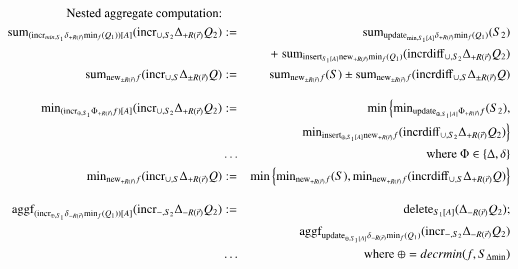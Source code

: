 \documentclass{article}
\begin{document}
%
\begin{figure*}
\begin{eqnarray}
\mbox{Nested aggregate computation:} && \nonumber
\\
\label{eq:na1}
\algsum_{(\algincr_{min, S_1} \delta_{+R(\vec{r})} \algmin_{f}(Q_1))[A]}
(\algincr_{\cup,S_2} \Delta_{+R(\vec{r})} Q_2)
&:=&
\algsum_{\algupdate_{\min, S_{1}[A]} \delta_{+R(\vec{r})} \algmin_{f}(Q_1)}(S_2)
\\
\nonumber &&
+ \; \algsum_{\alginsert_{S_{1}[A]} \algnew_{+R(\vec{r})} \algmin_{f}(Q_1)}
    (\algincrdiff_{\cup, S_2} \Delta_{+R(\vec{r})} Q_2)
\\
\label{eq:na2}
\algsum_{\algnew_{\pm R(\vec{r})} f} (\algincr_{\cup,S} \Delta_{\pm R(\vec{r})} Q)
&:=&
\algsum_{\algnew_{\pm R(\vec{r})} f}(S) 
    \pm \algsum_{\algnew_{\pm R(\vec{r})} f}
        (\algincrdiff_{\cup, S} \Delta_{\pm R(\vec{r})} Q)
%
%
\\[2ex]
\label{eq:na3}
\algmin_{(\algincr_{\oplus, S_1} \Phi_{+ R(\vec{r})} f)[A]}
(\algincr_{\cup, S_2} \Delta_{+R(\vec{r})} Q_2)
&:=&
\min \Big\{
\algmin_{\algupdate_{\oplus, S_1[A]} \Phi_{+R(\vec{r})} f} (S_2),
\\
\nonumber &&
\qquad \; \algmin_{\alginsert_{\oplus, S_1[A]} \algnew_{+R(\vec{r})} f}
(\algincrdiff_{\cup, S_2} \Delta_{+R(\vec{r})} Q_2)
\Big\}
\\
\nonumber &\dots& \mbox{where $\Phi \in \{\Delta, \delta\}$}
\\
%
%
\label{eq:na4}
\algmin_{\algnew_{+R(\vec{r})} f} (\algincr_{\cup, S} \Delta_{+R(\vec{r})} Q)
&:=&
\min \Big\{
\algmin_{\algnew_{+R(\vec{r})} f} (S), 
\algmin_{\algnew_{+R(\vec{r})} f} (\algincrdiff_{\cup, S} \Delta_{+R(\vec{r})} Q)
\Big\}
%
%
%
\\[2ex]
\label{eq:na5}
\algaggf_{(\algincr_{\oplus, S_1} \delta_{-R(\vec{r})} \algmin_{f}(Q_1))[A]}
(\algincr_{-,S_2} \Delta_{-R(\vec{r})} Q_2)
&:=&
\algdelete_{S_{1}[A]}(\Delta_{-R(\vec{r})} Q_2);
\\
\nonumber &&
\algaggf_{\algupdate_{\oplus, S_{1}[A]}  \delta_{-R(\vec{r})} \algmin_{f}(Q_1)}
(\algincr_{-,S_2} \Delta_{-R(\vec{r})} Q_2)
\\
\nonumber &\dots& \mbox{where $\oplus = decrmin(f, S_{\Delta \algmin})$}
\end{eqnarray}
\end{figure*}


\pagebreak
\end{document}

